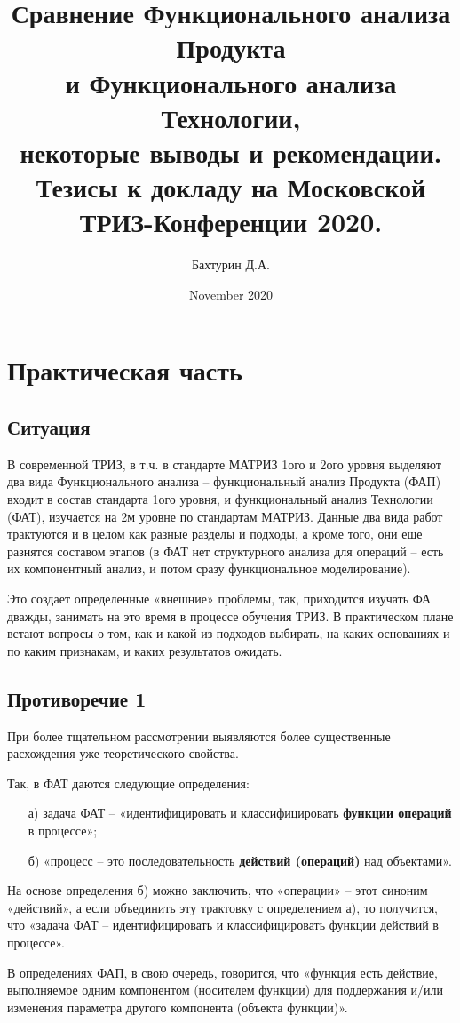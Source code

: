 \documentclass[11pt,a4paper]{article}
\title{Сравнение Функционального анализа Продукта\\ и Функционального анализа
  Технологии,\\ некоторые выводы и рекомендации.\\[1em] \Large Тезисы к
  докладу на Московской ТРИЗ-Конференции 2020.}
\author{Бахтурин Д.А.}
\date{November 2020}
\begin{document}
\maketitle
\tableofcontents

\section{Практическая часть}
\subsection{Ситуация}
В современной ТРИЗ, в т.ч. в стандарте МАТРИЗ 1ого и 2ого уровня выделяют два
вида Функционального анализа – функциональный анализ Продукта (ФАП) входит в
состав стандарта 1ого уровня, и функциональный анализ Технологии (ФАТ),
изучается на 2м уровне по стандартам МАТРИЗ. Данные два вида работ трактуются
и в целом как разные разделы и подходы, а кроме того, они еще разнятся
составом этапов (в ФАТ нет структурного анализа для операций -- есть их
компонентный анализ, и потом сразу функциональное моделирование).

Это создает определенные «внешние» проблемы, так, приходится изучать ФА
дважды, занимать на это время в процессе обучения ТРИЗ. В практическом плане
встают вопросы о том, как и какой из подходов выбирать, на каких основаниях и
по каким признакам, и каких результатов ожидать.

\subsection{Противоречие 1}
При более тщательном рассмотрении выявляются более существенные расхождения
уже теоретического свойства.

Так, в ФАТ даются следующие определения:
\begin{itemize}
\item[а)] задача ФАТ -- «идентифицировать и классифицировать \textbf{функции
  операций} в процессе»;
\item[б)] «процесс – это последовательность \textbf{действий (операций)} над
  объектами».
\end{itemize}
На основе определения б) можно заключить, что «операции» -- этот синоним
«действий», а если объединить эту трактовку с определением а), то получится,
что «задача ФАТ – идентифицировать и классифицировать функции действий в
процессе».

В определениях ФАП, в свою очередь, говорится, что «функция есть действие,
выполняемое одним компонентом (носителем функции) для поддержания и/или
изменения параметра другого компонента (объекта функции)».
\end{document}

